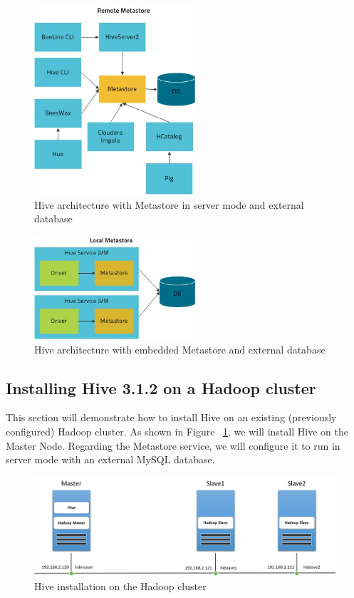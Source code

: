 \documentclass[12pt,english]{book}
\begin{document}


\begin{figure}[H]
	\centering
	\includegraphics[width=6cm]{hiveRemoteMetaStore}
	\caption[Hive architecture with Metastore in server mode and external database]{Hive architecture with Metastore in server mode and external database}
\end{figure}

\begin{figure}[H]
	\centering
	\includegraphics[width=6cm]{hiveLocalMetastore}
	\caption[Hive architecture with embedded Metastore and external database]{Hive architecture with embedded Metastore and external database}
\end{figure}

\subsection{Installing Hive 3.1.2 on a Hadoop cluster}

This section will demonstrate how to install Hive on an existing (previously configured) Hadoop cluster.
As shown in Figure ~\ref{fig:hiveInstallation}, we will install Hive on the Master Node.
Regarding the Metastore service, we will configure it to run in server mode with an external MySQL database.

\begin{figure}[H]
	\centering
	\includegraphics[width=\linewidth]{hiveCluster}
	\caption{Hive installation on the Hadoop cluster}
        \label{fig:hiveInstallation}
\end{figure}
\end{document}
